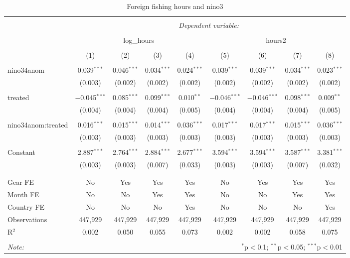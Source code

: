 
\begin{table}[!htbp] \centering 
  \caption{\label{tab:ff_reg}Foreign fishing hours and nino3} 
  \label{} 
\small 
\begin{tabular}{@{\extracolsep{5pt}}lcccccccc} 
\\[-1.8ex]\hline 
\hline \\[-1.8ex] 
 & \multicolumn{8}{c}{\textit{Dependent variable:}} \\ 
\cline{2-9} 
\\[-1.8ex] & \multicolumn{4}{c}{log\_hours} & \multicolumn{4}{c}{hours2} \\ 
\\[-1.8ex] & (1) & (2) & (3) & (4) & (5) & (6) & (7) & (8)\\ 
\hline \\[-1.8ex] 
 nino34anom & 0.039$^{***}$ & 0.046$^{***}$ & 0.034$^{***}$ & 0.024$^{***}$ & 0.039$^{***}$ & 0.039$^{***}$ & 0.034$^{***}$ & 0.023$^{***}$ \\ 
  & (0.003) & (0.002) & (0.002) & (0.002) & (0.002) & (0.002) & (0.002) & (0.002) \\ 
  & & & & & & & & \\ 
 treated & $-$0.045$^{***}$ & 0.085$^{***}$ & 0.099$^{***}$ & 0.010$^{**}$ & $-$0.046$^{***}$ & $-$0.046$^{***}$ & 0.098$^{***}$ & 0.009$^{**}$ \\ 
  & (0.004) & (0.004) & (0.004) & (0.005) & (0.004) & (0.004) & (0.004) & (0.005) \\ 
  & & & & & & & & \\ 
 nino34anom:treated & 0.016$^{***}$ & 0.015$^{***}$ & 0.014$^{***}$ & 0.036$^{***}$ & 0.017$^{***}$ & 0.017$^{***}$ & 0.015$^{***}$ & 0.036$^{***}$ \\ 
  & (0.003) & (0.003) & (0.003) & (0.003) & (0.003) & (0.003) & (0.003) & (0.003) \\ 
  & & & & & & & & \\ 
 Constant & 2.887$^{***}$ & 2.764$^{***}$ & 2.884$^{***}$ & 2.677$^{***}$ & 3.594$^{***}$ & 3.594$^{***}$ & 3.587$^{***}$ & 3.381$^{***}$ \\ 
  & (0.003) & (0.003) & (0.007) & (0.033) & (0.003) & (0.003) & (0.007) & (0.032) \\ 
  & & & & & & & & \\ 
\hline \\[-1.8ex] 
Gear FE & No & Yes & Yes & Yes & No & Yes & Yes & Yes \\ 
Month FE & No & No & Yes & Yes & No & No & Yes & Yes \\ 
Country FE & No & No & No & Yes & No & No & No & Yes \\ 
Observations & 447,929 & 447,929 & 447,929 & 447,929 & 447,929 & 447,929 & 447,929 & 447,929 \\ 
R$^{2}$ & 0.002 & 0.050 & 0.055 & 0.073 & 0.002 & 0.002 & 0.058 & 0.075 \\ 
\hline 
\hline \\[-1.8ex] 
\textit{Note:}  & \multicolumn{8}{r}{$^{*}$p$<$0.1; $^{**}$p$<$0.05; $^{***}$p$<$0.01} \\ 
\end{tabular} 
\end{table} 